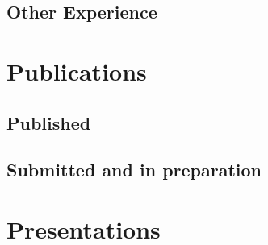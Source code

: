 \documentclass[letterpaper]{twentysecondcv} %
\begin{document}
\begin{finalpages}
\subsection{Other Experience}
\begin{twentyfull}
\end{twentyfull}


\section{Publications}
\subsection{Published}
\begin{itemize}
\end{itemize}

\subsection{Submitted and in preparation}
\begin{itemize}
\end{itemize}

\section{Presentations}
\begin{twentyfull}
\end{twentyfull}
\end{finalpages}
\end{document}
